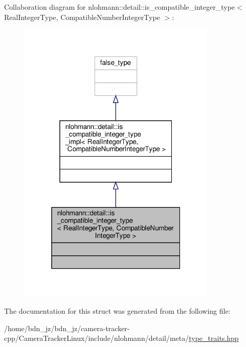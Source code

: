 Collaboration diagram for nlohmann\+:\+:detail\+:\+:is\+\_\+compatible\+\_\+integer\+\_\+type$<$ Real\+Integer\+Type, Compatible\+Number\+Integer\+Type $>$\+:\nopagebreak
\begin{figure}[H]
\begin{center}
\leavevmode
\includegraphics[width=268pt]{structnlohmann_1_1detail_1_1is__compatible__integer__type__coll__graph}
\end{center}
\end{figure}


The documentation for this struct was generated from the following file\+:\begin{DoxyCompactItemize}
\item 
/home/bdn\+\_\+jz/bdn\+\_\+jz/camera-\/tracker-\/cpp/\+Camera\+Tracker\+Linux/include/nlohmann/detail/meta/\hyperlink{type__traits_8hpp}{type\+\_\+traits.\+hpp}\end{DoxyCompactItemize}
